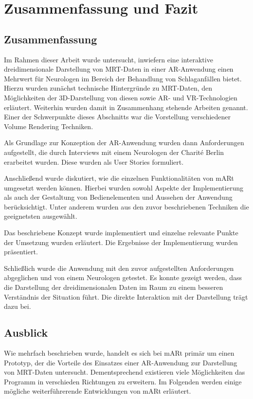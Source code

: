
\chapter{Zusammenfassung und Fazit}
\label{fazit}

\section{Zusammenfassung}

Im Rahmen dieser Arbeit wurde untersucht, inwiefern eine interaktive dreidimensionale Darstellung von MRT-Daten in einer AR-Anwendung einen Mehrwert für Neurologen im Bereich der Behandlung von Schlaganfällen bietet. 
Hierzu wurden zunächst technische Hintergründe zu MRT-Daten, den Möglichkeiten der 3D-Darstellung von diesen sowie AR- und VR-Technologien erläutert. Weiterhin wurden damit in Zusammenhang stehende Arbeiten genannt. Einer der Schwerpunkte dieses Abschnitts war die Vorstellung verschiedener Volume Rendering Techniken.

Als Grundlage zur Konzeption der AR-Anwendung wurden dann Anforderungen aufgestellt, die durch Interviews mit einem Neurologen der Charité Berlin erarbeitet wurden. Diese wurden als User Stories formuliert.

Anschließend wurde diskutiert, wie die einzelnen Funktionalitäten von mARt umgesetzt werden können. Hierbei wurden sowohl Aspekte der Implementierung als auch der Gestaltung von Bedienelementen und Aussehen der Anwendung berücksichtigt. Unter anderem wurden aus den zuvor beschriebenen Techniken die geeignetsten ausgewählt. 

Das beschriebene Konzept wurde implementiert und einzelne relevante Punkte der Umsetzung wurden erläutert. Die Ergebnisse der Implementierung wurden präsentiert.

Schließlich wurde die Anwendung mit den zuvor aufgestellten Anforderungen abgeglichen und von einem Neurologen getestet. 
Es konnte gezeigt werden, dass die Darstellung der dreidimensionalen Daten im Raum zu einem besseren Verständnis der Situation führt. Die direkte Interaktion mit der Darstellung trägt dazu bei. 

\section{Ausblick}

Wie mehrfach beschrieben wurde, handelt es sich bei mARt primär um einen Prototyp, der die Vorteile des Einsatzes einer AR-Anwendung zur Darstellung von MRT-Daten untersucht. Dementsprechend existieren viele Möglichkeiten das Programm in verschieden Richtungen zu erweitern.
Im Folgenden werden einige mögliche weiterführerende Entwicklungen von mARt erläutert.

